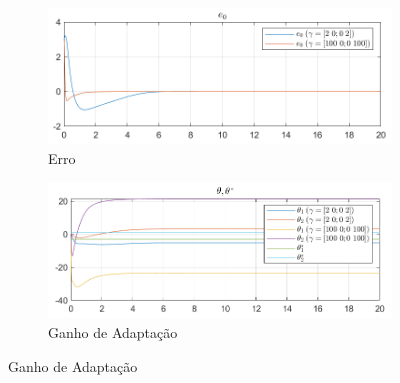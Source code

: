 \documentclass[10pt]{article}
\begin{document}
\begin{figure}[h!]
    \centering
    \begin{subfigure}[b]{0.45\textwidth}
        \centering
        \includegraphics[width=\textwidth]{img/fig03a.png}
        \caption{Erro}
    \end{subfigure}
    \begin{subfigure}[b]{0.45\textwidth}
        \centering
        \includegraphics[width=\textwidth]{img/fig03b.png}
        \caption{Ganho de Adaptação}
    \end{subfigure}

    \vspace{0.5cm}


\end{figure}
\end{document}
